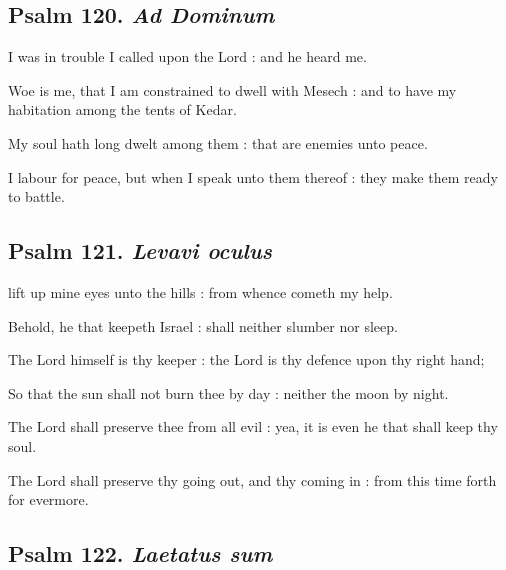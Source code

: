 \subsection{Psalm 120. \textit{Ad Dominum}}

 I was in trouble I called upon the Lord : and he heard me.\par
{}
Woe is me, that I am constrained to dwell with Mesech : and to have my habitation among the tents of Kedar.\par
{}My soul hath long dwelt among them : that are enemies unto peace.\par
{}I labour for peace, but when I speak unto them thereof : they make them ready to battle.\par

\subsection{Psalm 121. \textit{Levavi oculus}}

 lift up mine eyes unto the hills : from whence cometh my help.\par
{}
Behold, he that keepeth Israel : shall neither slumber nor sleep.\par
{}The Lord himself is thy keeper : the Lord is thy defence upon thy right hand;\par
{}So that the sun shall not burn thee by day : neither the moon by night.\par
{}The Lord shall preserve thee from all evil : yea, it is even he that shall keep thy soul.\par
{}The Lord shall preserve thy going out, and thy coming in : from this time forth for evermore.\par

\subsection{Psalm 122. \textit{Laetatus sum}}

